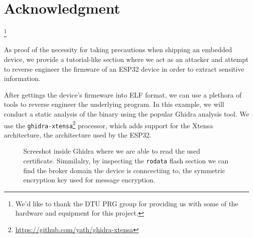 \documentclass[conference]{IEEEtran}
\begin{document}
\section*{Acknowledgment}

\thanks{We'd like to thank the DTU PRG group for providing us with some of the hardware and equipment for this project.}




\appendices
{}

\label{appendix:reverse_engineering}

As proof of the necessity for taking precautions when shipping an embedded device, 
we provide a tutorial-like section where we act as an attacker and attempt to reverse engineer the firmware of an ESP32
device in order to extract sensitive information.


After gettings the device's firmeware into ELF format, we can use a plethora of tools 
to reverse engineer the underlying program. 
In this example, we will conduct a static analysis of the binary using the popular Ghidra\cite{Ghidra,GhidraBook} analysis tool.
We use the \texttt{ghidra-xtensa}\footnote{\url{https://github.com/yath/ghidra-xtensa}} processor,
which adds support for the Xtensa architecture, the architecture used by the ESP32.

\begin{figure}[h]
    \centering
    \caption{Screeshot inside Ghidra where we are able to read the used certificate. Simmilalry, 
    by inspecting the \texttt{rodata} flash section we can find the broker domain the device is conncectiing to, the 
    symmetric encryption key used for message encryption.}
    \label{fig:ghidra}
\end{figure}
\end{document}
